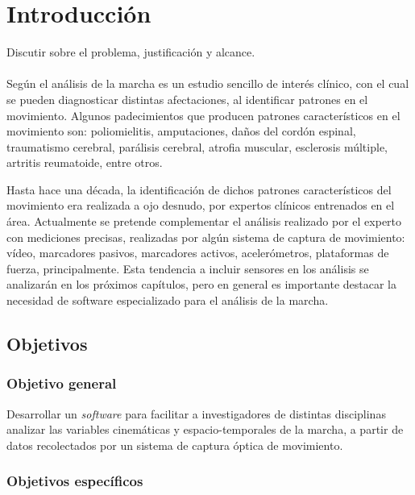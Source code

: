 \chapter{Introducción}

Discutir sobre el problema, justificación y alcance. \\
 \\
Según \cite{perry} el análisis de la marcha es un estudio sencillo de interés clínico, con el cual se pueden diagnosticar distintas afectaciones, al identificar patrones en el movimiento. Algunos padecimientos que producen patrones característicos en el movimiento son: poliomielitis, amputaciones, daños del cordón espinal, traumatismo cerebral, parálisis cerebral, atrofia muscular, esclerosis múltiple, artritis reumatoide, entre otros. 

Hasta hace una década, la identificación de dichos patrones característicos del movimiento era realizada a ojo desnudo, por expertos clínicos entrenados en el área. Actualmente se pretende complementar el análisis realizado por el experto con mediciones precisas, realizadas por algún sistema de captura de movimiento: vídeo, marcadores pasivos, marcadores activos, acelerómetros, plataformas de fuerza, principalmente. Esta tendencia a incluir sensores en los análisis se analizarán en los próximos capítulos, pero en general es importante destacar la necesidad de software especializado para el análisis de la marcha. 


\section{Objetivos}

\subsection{Objetivo general}

Desarrollar un \emph{software} para facilitar a investigadores de distintas disciplinas analizar las variables cinemáticas y espacio-temporales de la marcha, a partir de datos recolectados por un sistema de captura óptica de movimiento.

\subsection{Objetivos específicos}

